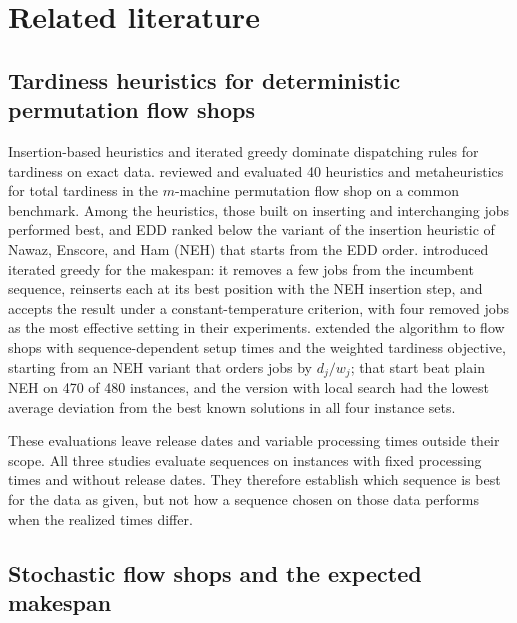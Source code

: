 \section{Related literature}\label{sec:literature}

\subsection{Tardiness heuristics for deterministic permutation flow shops}\label{sec:lit-deterministic}

\sumpara Insertion-based heuristics and iterated greedy dominate dispatching rules for tardiness on exact data. \sumparaend
\fin \citet{vallada2008review} reviewed and evaluated 40 heuristics and metaheuristics for total tardiness in the $m$-machine permutation flow shop on a common benchmark. \fine
\fin Among the heuristics, those built on inserting and interchanging jobs performed best, and EDD ranked below the variant of the insertion heuristic of Nawaz, Enscore, and Ham (NEH) that starts from the EDD order. \fine
\fin \citet{ruiz2007ig} introduced iterated greedy for the makespan: it removes a few jobs from the incumbent sequence, reinserts each at its best position with the NEH insertion step, and accepts the result under a constant-temperature criterion, with four removed jobs as the most effective setting in their experiments. \fine
\fin \citet{ruiz2008igwt} extended the algorithm to flow shops with sequence-dependent setup times and the weighted tardiness objective, starting from an NEH variant that orders jobs by $d_j / w_j$; that start beat plain NEH on 470 of 480 instances, and the version with local search had the lowest average deviation from the best known solutions in all four instance sets. \fine

\sumpara These evaluations leave release dates and variable processing times outside their scope. \sumparaend
\fin All three studies evaluate sequences on instances with fixed processing times and without release dates. \fine
\fin They therefore establish which sequence is best for the data as given, but not how a sequence chosen on those data performs when the realized times differ. \fine

\subsection{Stochastic flow shops and the expected makespan}\label{sec:lit-uncertain}

